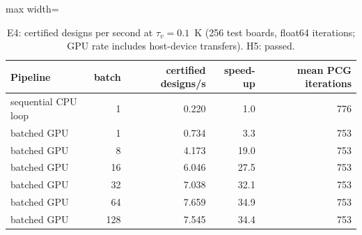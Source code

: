 \begin{table}[t]\centering\small
\begin{adjustbox}{max width=\linewidth}\begin{tabular}{lrrrr}
\hline
Pipeline & batch & certified designs/s & speed-up & mean PCG iterations \\
\hline
sequential CPU loop & 1 & 0.220 & 1.0 & 776 \\
batched GPU & 1 & 0.734 & 3.3 & 753 \\
batched GPU & 8 & 4.173 & 19.0 & 753 \\
batched GPU & 16 & 6.046 & 27.5 & 753 \\
batched GPU & 32 & 7.038 & 32.1 & 753 \\
batched GPU & 64 & 7.659 & 34.9 & 753 \\
batched GPU & 128 & 7.545 & 34.4 & 753 \\
\hline
\end{tabular}\end{adjustbox}
\caption{E4: certified designs per second at $\tau_v = 0.1$~K (256 test boards, float64 iterations; GPU rate includes host-device transfers). H5: passed.}
\label{tab:e4}
\end{table}
